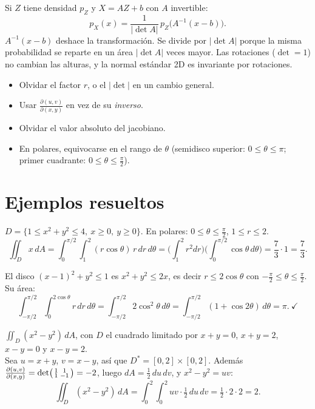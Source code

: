 \documentclass[11pt,a4paper]{article}
\newcommand{\dA}{\,dA}
\begin{document}
\begin{resumen}
Si $Z$ tiene densidad $p_Z$ y $X=AZ+b$ con $A$ invertible:
\[
p_X(x)=\frac{1}{|\det A|}\,p_Z\big(A^{-1}(x-b)\big).
\]
$A^{-1}(x-b)$ deshace la transformación. Se divide por $|\det A|$ porque la misma probabilidad se reparte en un área $|\det A|$ veces mayor. Las rotaciones ($\det=1$) no cambian las alturas, y la normal estándar 2D es invariante por rotaciones.
\end{resumen}

\begin{ojo}
\begin{itemize}[leftmargin=*,itemsep=1pt]
\item Olvidar el factor $r$, o el $|\det|$ en un cambio general.
\item Usar $\frac{\partial(u,v)}{\partial(x,y)}$ en vez de su \emph{inverso}.
\item Olvidar el valor absoluto del jacobiano.
\item En polares, equivocarse en el rango de $\theta$ (semidisco superior: $0\le\theta\le\pi$; primer cuadrante: $0\le\theta\le\frac\pi2$).
\end{itemize}
\end{ojo}

\section{Ejemplos resueltos}

\begin{ejemplo}
$D=\{1\le x^2+y^2\le4,\ x\ge0,\ y\ge0\}$. En polares: $0\le\theta\le\frac\pi2$, $1\le r\le2$.
\[
\iint_D x\dA=\int_0^{\pi/2}\!\!\int_1^2 (r\cos\theta)\,r\,dr\,d\theta=\Big(\int_1^2r^2dr\Big)\Big(\int_0^{\pi/2}\cos\theta\,d\theta\Big)=\frac73\cdot1=\frac73 .
\]
\end{ejemplo}

\begin{ejemplo}
El disco $(x-1)^2+y^2\le1$ es $x^2+y^2\le2x$, es decir $r\le2\cos\theta$ con $-\frac\pi2\le\theta\le\frac\pi2$. Su área:
\[
\int_{-\pi/2}^{\pi/2}\!\!\int_0^{2\cos\theta}r\,dr\,d\theta=\int_{-\pi/2}^{\pi/2}2\cos^2\theta\,d\theta=\int_{-\pi/2}^{\pi/2}(1+\cos2\theta)\,d\theta=\pi.\ \checkmark
\]
\end{ejemplo}

\begin{ejemplo}
$\iint_D(x^2-y^2)\dA$, con $D$ el cuadrado limitado por $x+y=0$, $x+y=2$, $x-y=0$ y $x-y=2$.\\
Sea $u=x+y$, $v=x-y$, así que $D^*=[0,2]\times[0,2]$. Además
$\frac{\partial(u,v)}{\partial(x,y)}=\det\begin{psmallmatrix}1&1\\1&-1\end{psmallmatrix}=-2$, luego $dA=\tfrac12\,du\,dv$, y $x^2-y^2=uv$:
\[
\iint_D(x^2-y^2)\dA=\int_0^2\!\!\int_0^2 uv\cdot\tfrac12\,du\,dv=\tfrac12\cdot2\cdot2=2.
\]
\end{ejemplo}
\end{document}
